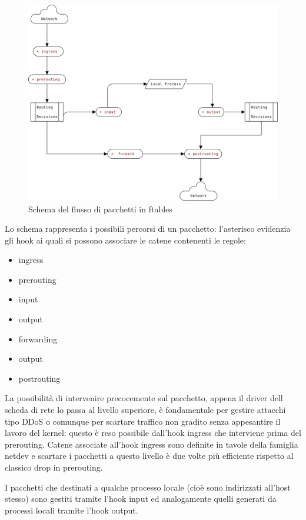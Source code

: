 \begin{figure}[H]
    \centering
    \includegraphics[width=\linewidth]{flow.svg.png}
    \caption{Schema del flusso di pacchetti in ftables}
    \label{fig:flow}
\end{figure}
Lo schema rappresenta i possibili percorsi di un pacchetto: l'asterisco
evidenzia gli hook ai quali si possono associare le catene contenenti le
regole:
\begin{itemize}
    \item ingress
    \item prerouting
    \item input
    \item output
    \item forwarding
    \item output
    \item postrouting
\end{itemize}
La possibilit\`a di intervenire precocemente sul pacchetto, appena il driver
dell scheda di rete lo passa al livello superiore, \`e fondamentale per gestire
attacchi tipo DDoS o comunque per scartare traffico non gradito senza
appesantire il lavoro del kernel: questo \`e reso possibile dall'hook ingress
che interviene prima del prerouting. Catene associate all'hook ingress sono
definite in tavole della famiglia netdev e scartare i pacchetti a questo
livello \`e due volte pi\`u efficiente rispetto al classico drop in prerouting.

I pacchetti che destinati a qualche processo locale (cioè sono indirizzati
all'host stesso) sono gestiti tramite l'hook input ed analogamente quelli
generati da processi locali tramite l'hook output.

